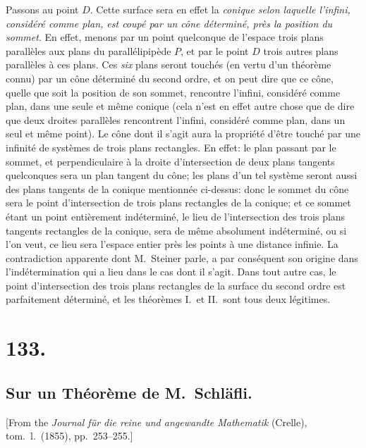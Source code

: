 \documentclass[11pt,a4paper]{book}
\begin{document}
Passons au point $D$. Cette surface sera en effet la \textit{conique selon
laquelle l'infini, consid\'er\'e comme plan, est coup\'e par un c\^one
d\'etermin\'e, pr\`es la position du sommet}. En effet, menons par un point
quelconque de l'espace trois plans parall\`eles aux plans du parall\'elipip\`ede
$P$, et par le point $D$ trois autres plans parall\`eles \`a ces plans. Ces
\textit{six} plans seront touch\'es (en vertu d'un th\'eor\`eme connu) par un
c\^one d\'etermin\'e du second ordre, et on peut dire que ce c\^one, quelle
que soit la position de son sommet, rencontre l'infini, consid\'er\'e comme
plan, dans une seule et m\^eme conique (cela n'est en effet autre chose que
de dire que deux droites parall\`eles rencontrent l'infini, consid\'er\'e
comme plan, dans un seul et m\^eme point). Le c\^one dont il s'agit aura la
propri\'et\'e d'\^etre touch\'e par une infinit\'e de syst\`emes de trois plans
rectangles. En effet: le plan passant par le sommet, et perpendiculaire
\`a la droite d'intersection de deux plans tangents quelconques sera un
plan tangent du c\^one; les plans d'un tel syst\`eme seront aussi des plans
tangents de la conique mentionn\'ee ci-dessus: donc le sommet du c\^one sera
le point d'intersection de trois plans rectangles de la conique; et ce
sommet \'etant un point enti\`erement ind\'etermin\'e, le lieu de
l'intersection des trois plans tangents rectangles de la conique, sera de
m\^eme absolument ind\'etermin\'e, ou si l'on veut, ce lieu sera l'espace
entier pr\`es les points \`a une distance infinie. La contradiction apparente
dont M.~Steiner parle, a par cons\'equent son origine dans l'ind\'etermination
qui a lieu dans le cas dont il s'agit. Dans tout autre cas, le point
d'intersection des trois plans rectangles de la surface du second ordre est
parfaitement d\'etermin\'e, et les th\'eor\`emes I.\ et II.\ sont tous deux
l\'egitimes.

\newpage
\section*{133.}
\subsection*{Sur un Th\'eor\`eme de M.~Schl\"afli.}

[From the \textit{Journal f\"ur die reine und angewandte Mathematik} (Crelle),
tom.\ l.\ (1855), pp.\ 253--255.]
\end{document}
